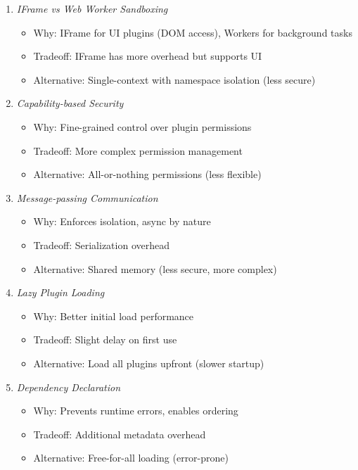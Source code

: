 \documentclass[11pt]{article}
\begin{document}
\begin{enumerate}
\item \emph{IFrame vs Web Worker Sandboxing}

\begin{itemize}
\item Why: IFrame for UI plugins (DOM access), Workers for background tasks
\item Tradeoff: IFrame has more overhead but supports UI
\item Alternative: Single-context with namespace isolation (less secure)
\end{itemize}

\item \emph{Capability-based Security}

\begin{itemize}
\item Why: Fine-grained control over plugin permissions
\item Tradeoff: More complex permission management
\item Alternative: All-or-nothing permissions (less flexible)
\end{itemize}

\item \emph{Message-passing Communication}

\begin{itemize}
\item Why: Enforces isolation, async by nature
\item Tradeoff: Serialization overhead
\item Alternative: Shared memory (less secure, more complex)
\end{itemize}

\item \emph{Lazy Plugin Loading}

\begin{itemize}
\item Why: Better initial load performance
\item Tradeoff: Slight delay on first use
\item Alternative: Load all plugins upfront (slower startup)
\end{itemize}

\item \emph{Dependency Declaration}
\begin{itemize}
\item Why: Prevents runtime errors, enables ordering
\item Tradeoff: Additional metadata overhead
\item Alternative: Free-for-all loading (error-prone)
\end{itemize}
\end{enumerate}
\end{document}
